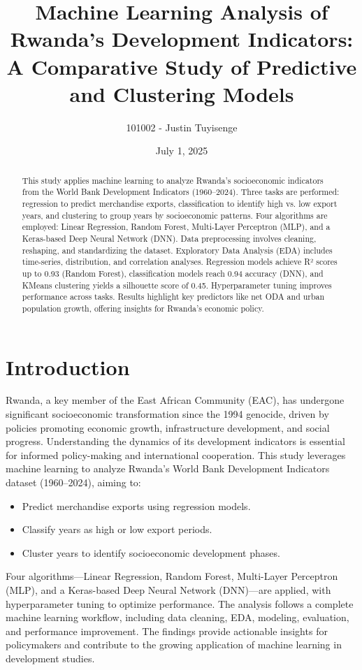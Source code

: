 \documentclass[12pt]{article}
\begin{document}
	
	\title{Machine Learning Analysis of Rwanda's Development Indicators: A Comparative Study of Predictive and Clustering Models}
	\author{101002 - Justin Tuyisenge}
	\date{July 1, 2025}
	\maketitle
	
	\begin{abstract}
		This study applies machine learning to analyze Rwanda's socioeconomic indicators from the World Bank Development Indicators (1960–2024). Three tasks are performed: regression to predict merchandise exports, classification to identify high vs. low export years, and clustering to group years by socioeconomic patterns. Four algorithms are employed: Linear Regression, Random Forest, Multi-Layer Perceptron (MLP), and a Keras-based Deep Neural Network (DNN). Data preprocessing involves cleaning, reshaping, and standardizing the dataset. Exploratory Data Analysis (EDA) includes time-series, distribution, and correlation analyses. Regression models achieve R² scores up to 0.93 (Random Forest), classification models reach 0.94 accuracy (DNN), and KMeans clustering yields a silhouette score of 0.45. Hyperparameter tuning improves performance across tasks. Results highlight key predictors like net ODA and urban population growth, offering insights for Rwanda's economic policy.
		
	\end{abstract}
	
	\section{Introduction}
	Rwanda, a key member of the East African Community (EAC), has undergone significant socioeconomic transformation since the 1994 genocide, driven by policies promoting economic growth, infrastructure development, and social progress. Understanding the dynamics of its development indicators is essential for informed policy-making and international cooperation. This study leverages machine learning to analyze Rwanda's World Bank Development Indicators dataset (1960–2024), aiming to:
	\begin{itemize}
		\item Predict merchandise exports using regression models.
		\item Classify years as high or low export periods.
		\item Cluster years to identify socioeconomic development phases.
	\end{itemize}
	Four algorithms—Linear Regression, Random Forest, Multi-Layer Perceptron (MLP), and a Keras-based Deep Neural Network (DNN)—are applied, with hyperparameter tuning to optimize performance. The analysis follows a complete machine learning workflow, including data cleaning, EDA, modeling, evaluation, and performance improvement. The findings provide actionable insights for policymakers and contribute to the growing application of machine learning in development studies.
	
\end{document}
